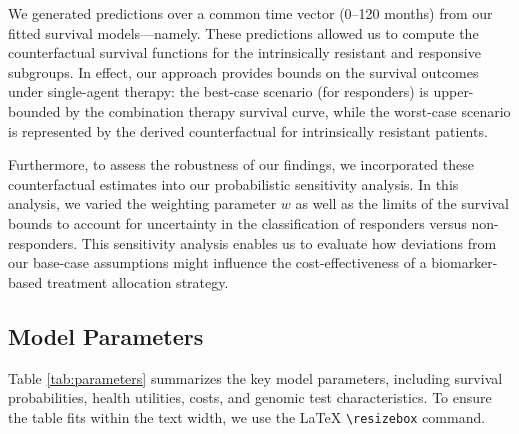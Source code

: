 \documentclass[preprint, 3p,
authoryear]{elsarticle} %
\begin{document}
We generated predictions over a common time vector (0--120 months) from
our fitted survival models---namely. These predictions allowed us to
compute the counterfactual survival functions for the intrinsically
resistant and responsive subgroups. In effect, our approach provides
bounds on the survival outcomes under single-agent therapy: the
best-case scenario (for responders) is upper-bounded by the combination
therapy survival curve, while the worst-case scenario is represented by
the derived counterfactual for intrinsically resistant patients.

Furthermore, to assess the robustness of our findings, we incorporated
these counterfactual estimates into our probabilistic sensitivity
analysis. In this analysis, we varied the weighting parameter \(w\) as
well as the limits of the survival bounds to account for uncertainty in
the classification of responders versus non-responders. This sensitivity
analysis enables us to evaluate how deviations from our base-case
assumptions might influence the cost-effectiveness of a biomarker-based
treatment allocation strategy.

\subsection{Model Parameters}\label{model-parameters}

Table \hyperref[tab:parameters]{\ref{tab:parameters}} summarizes the key
model parameters, including survival probabilities, health utilities,
costs, and genomic test characteristics. To ensure the table fits within
the text width, we use the LaTeX \texttt{\textbackslash resizebox}
command.
\end{document}
